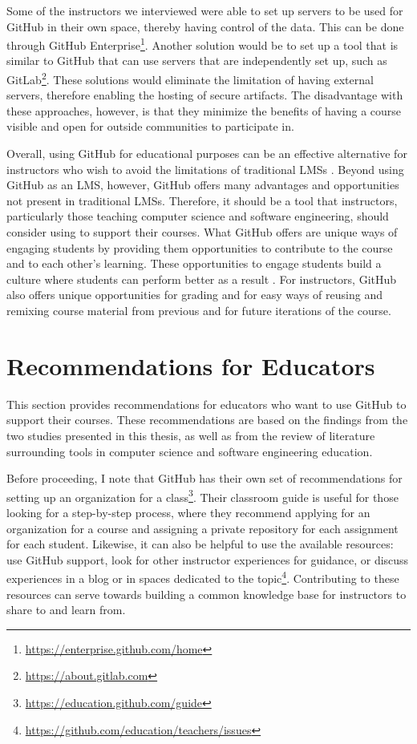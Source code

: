 Some of the instructors we interviewed were able to set up servers to be used for GitHub in their own space, thereby having control of the data. This can be done through GitHub Enterprise\footnote{\url{https://enterprise.github.com/home}}. Another solution would be to set up a tool that is similar to GitHub that can use servers that are independently set up, such as GitLab\footnote{\url{https://about.gitlab.com}}. These solutions would eliminate the limitation of having external servers, therefore enabling the hosting of secure artifacts. The disadvantage with these approaches, however, is that they minimize the benefits of having a course visible and open for outside communities to participate in.

Overall, using GitHub for educational purposes can be an effective alternative for instructors who wish to avoid the limitations of traditional LMSs \cite{garcia2011opening}. Beyond using GitHub as an LMS, however, GitHub offers many advantages and opportunities not present in traditional LMSs. Therefore, it should be a tool that instructors, particularly those teaching computer science and software engineering, should consider using to support their courses. What GitHub offers are unique ways of engaging students by providing them opportunities to contribute to the course and to each other's learning. These opportunities to engage students build a culture where students can perform better as a result \cite{kuh2001assessing}. For instructors, GitHub also offers unique opportunities for grading and for easy ways of reusing and remixing course material from previous and for future iterations of the course.

\section{Recommendations for Educators}
This section provides recommendations for educators who want to use GitHub to support their courses. These recommendations are based on the findings from the two studies presented in this thesis, as well as from the review of literature surrounding tools in computer science and software engineering education.

Before proceeding, I note that GitHub has their own set of recommendations for setting up an organization for a class\footnote{\url{https://education.github.com/guide}}. Their classroom guide is useful for those looking for a step-by-step process, where they recommend applying for an organization for a course and assigning a private repository for each assignment for each student. Likewise, it can also be helpful to use the available resources: use GitHub support, look for other instructor experiences for guidance, or discuss experiences in a blog or in spaces dedicated to the topic\footnote{\url{https://github.com/education/teachers/issues}}. Contributing to these resources can serve towards building a common knowledge base for instructors to share to and learn from. \\

